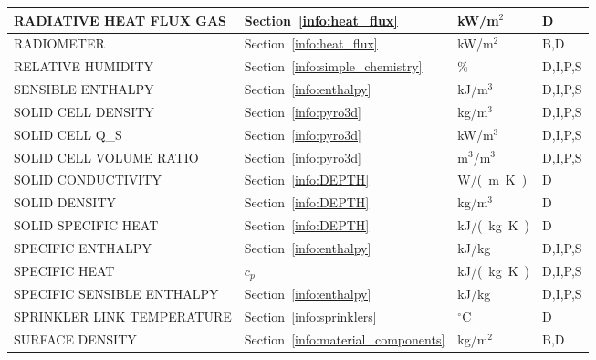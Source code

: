 \documentclass[11pt]{book}
\begin{document}
\begin{longtable}{@{\extracolsep{\fill}}|l|l|l|l|}
{\ct RADIATIVE HEAT FLUX GAS}                   & Section~\ref{info:heat_flux}                  & kW/m$^2$       & D            \\ \hline
{\ct RADIOMETER}                                & Section~\ref{info:heat_flux}                  & kW/m$^2$       & B,D          \\ \hline
{\ct RELATIVE HUMIDITY}                         & Section~\ref{info:simple_chemistry}           & \%             & D,I,P,S      \\ \hline
{\ct SENSIBLE ENTHALPY}                         & Section~\ref{info:enthalpy}                   & kJ/m$^3$       & D,I,P,S      \\ \hline
{\ct SOLID CELL DENSITY}                        & Section~\ref{info:pyro3d}                     & kg/m$^3$       & D,I,P,S      \\ \hline
{\ct SOLID CELL Q\_S}                           & Section~\ref{info:pyro3d}                     & kW/m$^3$       & D,I,P,S      \\ \hline
{\ct SOLID CELL VOLUME RATIO}                   & Section~\ref{info:pyro3d}                     & m$^3$/m$^3$    & D,I,P,S      \\ \hline
{\ct SOLID CONDUCTIVITY}                        & Section~\ref{info:DEPTH}                      & \si{W/(m.K)}   & D            \\ \hline
{\ct SOLID DENSITY}                             & Section~\ref{info:DEPTH}                      & kg/m$^3$       & D            \\ \hline
{\ct SOLID SPECIFIC HEAT}                       & Section~\ref{info:DEPTH}                      & \si{kJ/(kg.K)} & D            \\ \hline
{\ct SPECIFIC ENTHALPY}                         & Section~\ref{info:enthalpy}                   & kJ/kg          & D,I,P,S      \\ \hline
{\ct SPECIFIC HEAT}                             & $c_p$                                         & \si{kJ/(kg.K)} & D,I,P,S      \\ \hline
{\ct SPECIFIC SENSIBLE ENTHALPY}                & Section~\ref{info:enthalpy}                   & kJ/kg          & D,I,P,S      \\ \hline
{\ct SPRINKLER LINK TEMPERATURE}                & Section~\ref{info:sprinklers}                 & $^\circ$C      & D            \\ \hline
{\ct SURFACE DENSITY}                           & Section~\ref{info:material_components}        & kg/m$^2$       & B,D          \\ \hline

\end{longtable}
\end{document}
